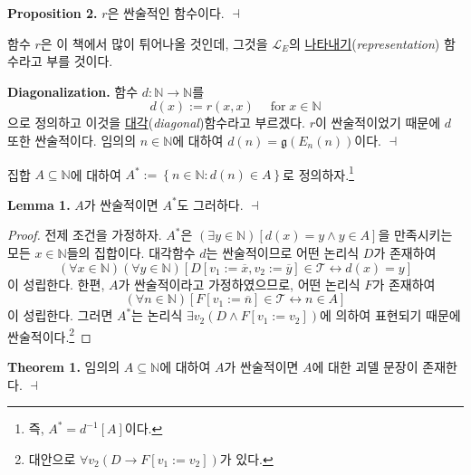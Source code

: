 \documentclass[12pt]{paper}
\newcommand{\gnum}{ \mathfrak{g} }
\newenvironment{context}[1][]{\noindent \textbf{{#1}.}}{\hfill $ \dashv $}
\begin{document}
  \begin{context}[Proposition 2]
    $r$은 싼술적인 함수이다.
  \end{context}

  함수 $r$은 이 책에서 많이 튀어나올 것인데, 그것을 $\mathcal{L}_{E}$의 \underline{나타내기}(\textit{representation}) 함수라고 부를 것이다.

  \begin{context}[Diagonalization]
    함수 $d : \mathbb{N} \to \mathbb{N}$를 $$d \left( x \right) := r \left( x , x \right) \quad \mathop{\mathrm{for}} x \in \mathbb{N} $$으로 정의하고
    이것을 \underline{대각}(\textit{diagonal})함수라고 부르겠다.
    $r$이 싼술적이었기 때문에 $d$ 또한 싼술적이다.
    임의의 $n \in \mathbb{N}$에 대하여 $d \left( n \right) = \gnum \left( E_{n} \left( n \right) \right)$이다.
  \end{context}

  집합 $A \subseteq \mathbb{N}$에 대하여 $A^{*} := \left\{ n \in \mathbb{N} : d \left( n \right) \in A \right\}$로 정의하자.\footnote
  {
    즉, $A^{*} = d^{-1} \left[ A \right]$이다.
  }

  \begin{context}[Lemma 1]
    $A$가 싼술적이면 $A^{*}$도 그러하다.
  \end{context}

  \begin{proof}
    전제 조건을 가정하자.
    $A^{*}$은 $\left( \exists y \in \mathbb{N} \right) \left[ d \left( x \right) = y \land y \in A \right]$을 만족시키는 모든 $x \in \mathbb{N}$들의 집합이다.
    대각함수 $d$는 싼술적이므로 어떤 논리식 $D$가 존재하여 $$ \left( \forall x \in \mathbb{N} \right) \left( \forall y \in \mathbb{N} \right) \left[ D \left[ v_1 := \overline{x} , v_2 := \overline{y} \right] \in \mathcal{T} \leftrightarrow d \left( x \right) = y \right] $$이 성립한다.
    한편, $A$가 싼술적이라고 가정하였으므로, 어떤 논리식 $F$가 존재하여 $$ \left( \forall n \in \mathbb{N} \right) \left[ F \left[ v_1 := \overline{n} \right] \in \mathcal{T} \leftrightarrow n \in A \right]$$이 성립한다.
    그러면 $A^{*}$는 논리식 $\exists v_2 \left( D \land F \left[ v_1 := v_2 \right] \right)$에 의하여 표현되기 때문에 싼술적이다.\footnote
    {
      대안으로 $\forall v_2 \left( D \rightarrow F \left[ v_1 := v_2 \right] \right)$가 있다.
    }
  \end{proof}

  \begin{context}[Theorem 1]
    임의의 $A \subseteq \mathbb{N}$에 대하여 $A$가 싼술적이면 $A$에 대한 괴델 문장이 존재한다.
  \end{context}
\end{document}

